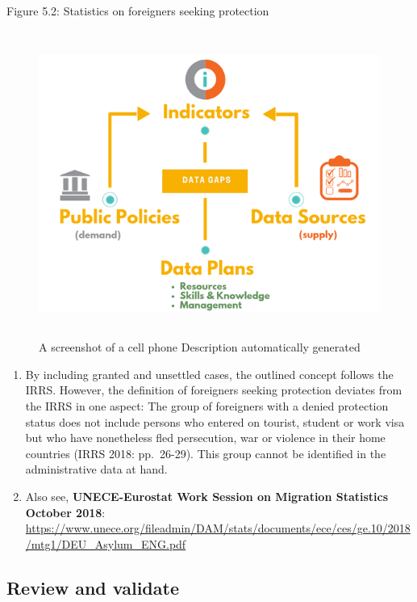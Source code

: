\documentclass[
]{article}
\begin{document}
Figure 5.2: Statistics on foreigners seeking protection

\begin{figure}
\centering
\includegraphics[width=6.4503in,height=3.93819in]{media/image2.png}
\caption{A screenshot of a cell phone Description automatically
generated}
\end{figure}

\begin{enumerate}
\def\labelenumi{\arabic{enumi}.}
\setcounter{enumi}{379}
\item
  By including granted and unsettled cases, the outlined concept
  follows the IRRS. However, the definition of foreigners seeking
  protection deviates from the IRRS in one aspect: The group of
  foreigners with a denied protection status does not include persons
  who entered on tourist, student or work visa but who have
  nonetheless fled persecution, war or violence in their home
  countries (IRRS 2018: pp.~26-29). This group cannot be identified in
  the administrative data at hand.
\item
  Also see, \textbf{UNECE-Eurostat Work Session on Migration Statistics
  October 2018}:
  \url{https://www.unece.org/fileadmin/DAM/stats/documents/ece/ces/ge.10/2018/mtg1/DEU_Asylum_ENG.pdf}
\end{enumerate}

\hypertarget{review-and-validate-1}{%
\subsection{Review and validate}\label{review-and-validate-1}}
\end{document}
